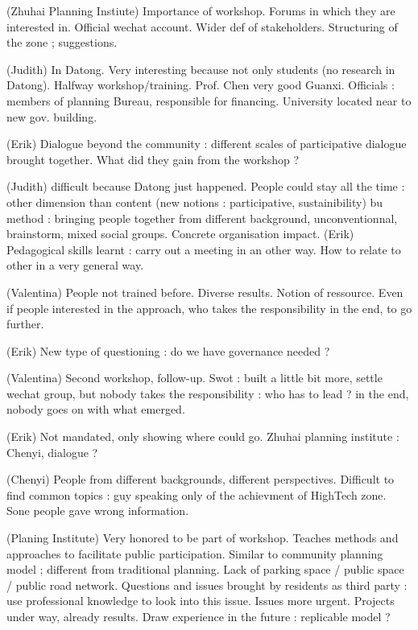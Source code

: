 (Zhuhai Planning Instiute) Importance of workshop. Forums in which they are interested in. Official wechat account. Wider def of stakeholders. Structuring of the zone ; suggestions.

(Judith) In Datong. Very interesting because not only students (no research in Datong). Halfway workshop/training. Prof. Chen very good Guanxi. Officials : members of planning Bureau, responsible for financing. University located near to new gov. building. 

(Erik) Dialogue beyond the community : different scales of participative dialogue brought together. What did they gain from the workshop ?

(Judith) difficult because Datong just happened. People could stay all the time : other dimension than content (new notions : participative, sustainibility) bu method : bringing people together from different background, unconventionnal, brainstorm, mixed social groups. Concrete organisation impact. (Erik) Pedagogical skills learnt : carry out a meeting in an other way. How to relate to other in a very general way.

(Valentina) People not trained before. Diverse results. Notion of ressource. Even if people interested in the approach, who takes the responsibility in the end, to go further.

(Erik) New type of questioning : do we have governance needed ?

(Valentina) Second workshop, follow-up. Swot : built a little bit more, settle wechat group, but nobody takes the responsibility : who has to lead ? in the end, nobody goes on with what emerged. 

(Erik) Not mandated, only showing where could go. Zhuhai planning institute : Chenyi, dialogue ?

(Chenyi) People from different backgrounds, different perspectives. Difficult to find common topics : guy speaking only of the achievment of HighTech zone. Sone people gave wrong information.

(Planing Institute) Very honored to be part of workshop. Teaches methods and approaches to facilitate public participation. Similar to community planning model ; different from traditional planning. Lack of parking space / public space / public road network. Questions and issues brought by residents as third party : use professional knowledge to look into this issue. Issues more urgent. Projects under way, already results. Draw experience in the future : replicable model ?


